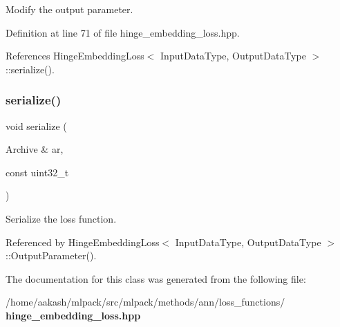Modify the output parameter. 



Definition at line 71 of file hinge\+\_\+embedding\+\_\+loss.\+hpp.



References Hinge\+Embedding\+Loss$<$ Input\+Data\+Type, Output\+Data\+Type $>$\+::serialize().

\mbox{\label{classmlpack_1_1ann_1_1HingeEmbeddingLoss_a65cba07328997659bec80b9879b15a51}} 
\subsubsection{serialize()}
{\footnotesize\ttfamily void serialize (\begin{DoxyParamCaption}\item[{Archive \&}]{ar,  }\item[{const uint32\+\_\+t}]{ }\end{DoxyParamCaption})}



Serialize the loss function. 



Referenced by Hinge\+Embedding\+Loss$<$ Input\+Data\+Type, Output\+Data\+Type $>$\+::\+Output\+Parameter().



The documentation for this class was generated from the following file\+:\begin{DoxyCompactItemize}
\item 
/home/aakash/mlpack/src/mlpack/methods/ann/loss\+\_\+functions/\textbf{ hinge\+\_\+embedding\+\_\+loss.\+hpp}\end{DoxyCompactItemize}
